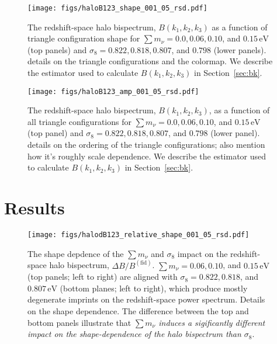 \documentclass[12pt, letterpaper, preprint]{aastex62}
\newcommand{\smnu}{\sum m_\nu}
\newcommand{\sig}{\sigma_8}
\newcommand{\ch}[1]{{\color{orange}{\bf CH:} #1}}
\begin{document}
\begin{figure}
\begin{center}
\texttt{[image: figs/haloB123\_shape\_001\_05\_rsd.pdf]}
    \caption{The redshift-space halo bispectrum, $B(k_1, k_2, k_3)$ as a 
    function of triangle configuration shape for $\smnu = 0.0, 0.06, 0.10$, 
    and $0.15\,\mathrm{eV}$ (top panels) and $\sig = 0.822, 0.818, 0.807$, 
    and $0.798$ (lower panels). 
    \ch{details on the triangle configurations and the colormap}.
    We describe the estimator used to calculate $B(k_1, k_2, k_3)$ in 
    Section~\ref{sec:bk}.}
\label{fig:bk_shape}
\end{center}
\end{figure}

\begin{figure}
\begin{center}
\texttt{[image: figs/haloB123\_amp\_001\_05\_rsd.pdf]}
    \caption{The redshift-space halo bispectrum, $B(k_1, k_2, k_3)$, as a
    function of all triangle configurations for $\smnu = 0.0, 0.06, 0.10$, 
    and $0.15\,\mathrm{eV}$ (top panel) and $\sig = 0.822, 0.818, 0.807$, 
    and $0.798$ (lower panel). 
    \ch{details on the ordering of the triangle configurations; also mention
    how it's roughly scale dependence}.
    We describe the estimator used to calculate $B(k_1, k_2, k_3)$ in 
    Section~\ref{sec:bk}.}
\label{fig:bk_amp}
\end{center}
\end{figure}


\section{Results} \label{sec:results} 

\begin{figure}
\begin{center}
\texttt{[image: figs/halodB123\_relative\_shape\_001\_05\_rsd.pdf]} 
    \caption{The shape depdence of the $\smnu$ and $\sig$ impact on the 
    redshift-space halo bispectrum, $\Delta B/B^\mathrm{(fid)}$. 
    $\smnu = 0.06, 0.10$, and $0.15\,\mathrm{eV}$ (top panels; left to right) are aligned
    with $\sig = 0.822, 0.818$, and $0.807\,\mathrm{eV}$ (bottom planes; left to right),
    which produce mostly degenerate imprints on the redshift-space power 
    spectrum. \ch{Details on the shape dependence}. 
    The difference between the top and bottom panels illustrate 
    that {\em $\smnu$ induces a sigificantly different impact on the 
    shape-dependence of the halo bispectrum than $\sig$}. 
    }
\label{fig:dbk_shape}
\end{center}
\end{figure}
\end{document}
